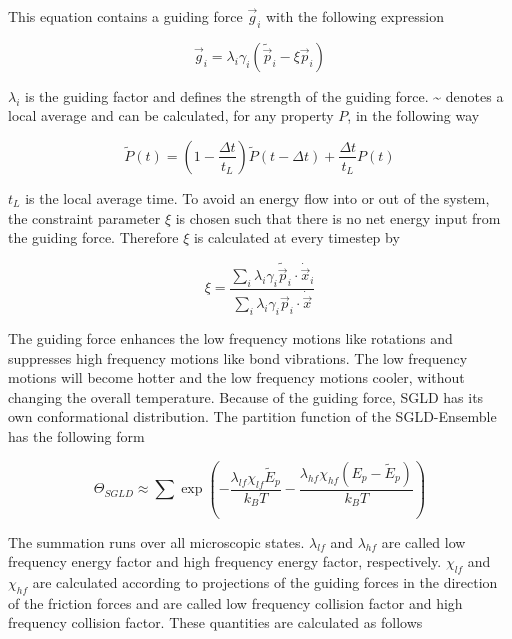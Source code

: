 \documentclass[a4paper]{article}
\begin{document}
This equation contains a guiding force $\vec{g}_i$ with the following expression

\begin{equation}
\vec{g}_i = \lambda_i \gamma_i (\tilde{\vec{p}}_i - \xi \vec{p}_i)
\label{eq:guiding_force}
\end{equation}

$\lambda_i$ is the guiding factor and defines the strength of the guiding force. \~{} denotes a local average and can be calculated, for any property $P$, in the following way

\begin{equation}
\tilde{P}(t) = \left( 1 - \frac{\Delta t}{t_L} \right) \tilde{P}(t - \Delta t) + \frac{\Delta t}{t_L} P(t)
\label{eq:local_average}
\end{equation}

$t_L$ is the local average time. To avoid an energy flow into or out of the system, the constraint parameter $\xi$ is chosen such that there is no net energy input from the guiding force. Therefore $\xi$ is calculated at every timestep by

\begin{equation}
\xi = \frac{\sum_i \lambda_i \gamma_i \tilde{\vec{p}}_i \cdot \dot{\vec{x}}_i}{\sum_i \lambda_i \gamma_i \vec{p}_i \cdot \dot{\vec{x}}}
\label{eq:constraint_parameter}
\end{equation}

The guiding force enhances the low frequency motions like rotations and suppresses high frequency motions like bond vibrations. The low frequency motions will become hotter and the low frequency motions cooler, without changing the overall temperature. Because of the guiding force, SGLD has its own conformational distribution. The partition function of the SGLD-Ensemble has the following form~\cite{XiongwuWu2011a} 

\begin{equation}
\Theta_{SGLD} \approx \sum \exp \left( - \frac{\lambda_{lf} \chi_{lf} \tilde{E}_p}{k_B T} - \frac{\lambda_{hf} \chi_{hf}(E_p - \tilde{E}_p)}{k_B T} \right)
\label{eq:partition_function_sgld}
\end{equation}

The summation runs over all microscopic states. $\lambda_{lf}$ and $\lambda_{hf}$ are called low frequency energy factor and high frequency energy factor, respectively. $\chi_{lf}$ and $\chi_{hf}$ are calculated according to projections of the guiding forces in the direction of the friction forces and are called low frequency collision factor and high frequency collision factor. These quantities are calculated as follows
\end{document}
